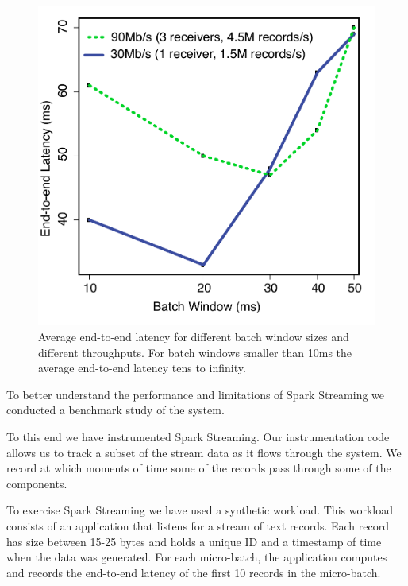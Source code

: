\begin{figure}[t!]
  \begin{center}
    \includegraphics[scale=0.50]{images_graphs/batchsize_vs_latency/batchsize_vs_latency_illustrator.pdf}
  \end{center}
  \caption{Average end-to-end latency for different batch window sizes and different throughputs. For batch windows smaller than 10ms the average end-to-end latency tens to infinity.}
  \label{fig:Batchsize_vs_latency}
\end{figure}



To better understand the performance and limitations of Spark Streaming we conducted a benchmark study of the system.

To this end we have instrumented Spark Streaming.
Our instrumentation code allows us to track a subset of the stream data as it flows through the system.
We record at which moments of time some of the records pass through some of the components.

To exercise Spark Streaming we have used a synthetic workload.
This workload consists of an application that listens for a stream of text records.
Each record has size between 15-25 bytes and holds a unique ID and a timestamp of time when the data was generated.
For each micro-batch, the application computes and records the end-to-end latency of the first 10 records in the micro-batch.

